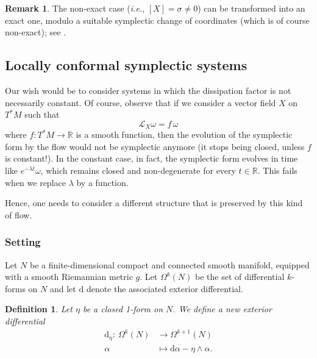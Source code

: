 \documentclass[11pt]{article}
\newtheorem{definition}[lemma]{Definition}
\theoremstyle{definition}
\newtheorem{remark}[lemma]{Remark}
\def\d{\mathrm{d}}
\begin{document}
\begin{remark}
The non-exact case ({\it i.e.}, $[X]= \sigma \neq 0$) can be transformed into an exact one, modulo a suitable symplectic change of coordinates (which is of course non-exact); see \cite[Remark 2]{MS}.
\end{remark}

\bigskip

\subsection{Locally conformal symplectic systems}

\noindent Our wish would be to consider systems in which the dissipation factor is not necessarily constant. Of course, observe that
if we consider a vector field $X$ on $T^*M$ such that
\begin{equation}
{\mathcal L}_X\omega = f \,\omega
\end{equation}
where $f: T^*M\longrightarrow {\mathbb R}$ is a smooth function, then the evolution of the symplectic form by the flow would not be symplectic anymore (it stops being closed, unless $f$ is constant!).
In the constant case, in fact, the symplectic form evolves in time like $e^{-\lambda t} \omega$, which remains closed and non-degenerate for every $t\in {\mathbb R}$. This fails when we replace $\lambda$ by a function.

Hence, one needs to consider a different structure that is preserved by this kind of flow.\\


\subsubsection{Setting}\label{sec2}

Let $N$ be a finite-dimensional compact and connected smooth manifold, equipped with a smooth Riemannian metric $g$.
Let $\Omega^k(N)$ be the set of differential $k$-forms on $N$ and let $\d$ denote the associated exterior differential.\\

\begin{definition}
Let $\eta$ be a closed 1-form on $N$. We define a new exterior differential
\begin{align}
  \d_\eta :\: \Omega^k(N)&\rightarrow\Omega^{k+1}(N) \nonumber \\
           \alpha &\mapsto \d\alpha -\eta\wedge\alpha.
\end{align}
\end{definition}
\end{document}
